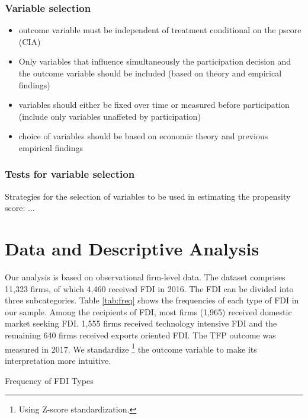 \documentclass[a4paper,11pt]{scrartcl}
\begin{document}
\subsubsection*{Variable selection}
\begin{itemize}
\item outcome variable must be independent of treatment conditional on the pscore (CIA)
\item Only variables that influence simultaneously the participation decision and the outcome variable should be included (based on theory and empirical findings)
\item variables should either be fixed over time or measured before participation (include only variables unaffeted by participation)
\item choice of variables should be based on economic theory and previous empirical findings
\end{itemize}

\subsubsection*{Tests for variable selection}
Strategies for the selection of variables to be used in estimating the propensity score: ...


\section{Data and Descriptive Analysis}
Our analysis is based on observational firm-level data. The dataset comprises 11,323 firms, of which 4,460 received FDI in 2016. The FDI can be divided into three subcategories. Table \ref{tab:freq} shows the frequencies of each type of FDI in our sample. Among the recipients of FDI, most firms (1,965) received domestic market seeking FDI. 1,555 firms received technology intensive FDI and the remaining 640 firms received exports oriented FDI. The TFP outcome was measured in 2017. We standardize \footnote{Using Z-score standardization.} the outcome variable to make its interpretation more intuitive. %

\begin{table}[h]
	\centering
	\caption{Frequency of FDI Types} 
	
\label{tab:freq}
\end{table}
\end{document}

